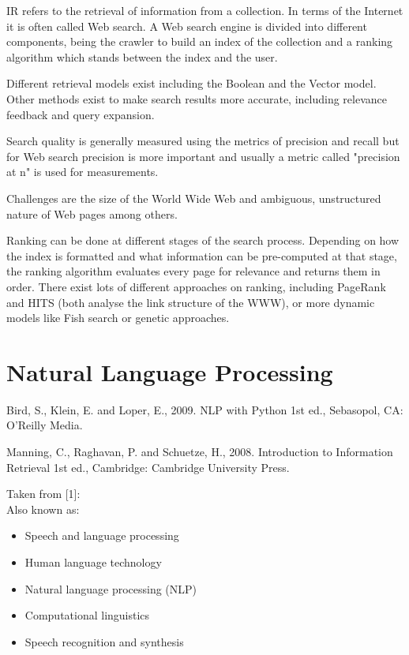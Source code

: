 IR refers to the retrieval of information from a collection. In terms of the Internet it is often called Web search. A Web search engine is divided into different components, being the crawler to build an index of the collection and a ranking algorithm which stands between the index and the user.

Different retrieval models exist including the Boolean and the Vector model. Other methods exist to make search results more accurate, including relevance feedback and query expansion.

Search quality is generally measured using the metrics of precision and recall but for Web search precision is more important and usually a metric called "precision at n" is used for measurements.

Challenges are the size of the World Wide Web and ambiguous, unstructured nature of Web pages among others.

Ranking can be done at different stages of the search process. Depending on how the index is formatted and what information can be pre-computed at that stage, the ranking algorithm evaluates every page for relevance and returns them in order. There exist lots of different approaches on ranking, including PageRank and HITS (both analyse the link structure of the WWW), or more dynamic models like Fish search or genetic approaches.

\section{Natural Language Processing}

\begin{comment}
  Damerau-Levensthein for clinamen!
\end{comment}

Bird, S., Klein, E. and Loper, E., 2009. NLP with Python 1st ed., Sebasopol, CA: O'Reilly Media.\citep{Bird2009}

Manning, C., Raghavan, P. and Schuetze, H., 2008. Introduction to Information Retrieval 1st ed., Cambridge: Cambridge University Press.\citep{Manning2009}

Taken from [1]:\citep{Jurafsky2009}\\
Also known as:\\
\begin{itemize}
  \item Speech and language processing
  \item Human language technology
  \item Natural language processing (NLP)
  \item Computational linguistics
  \item Speech recognition and synthesis
\end{itemize}

